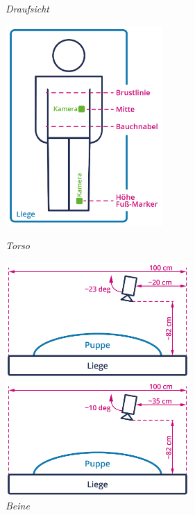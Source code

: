 \documentclass[a4paper, 10pt]{article}
\begin{document}
\begin{figure}[H]
    \centering
    \begin{minipage}[c]{0.475\linewidth}
        \centering
        \captionsetup{labelformat=empty}
        \caption{\textit{Draufsicht} \hspace*{10mm}}
        \vspace*{-4mm}
        \includegraphics[width=60mm]{cam-placements_topview.png}
    \end{minipage}
    \hspace*{-4mm}
    \begin{minipage}[c]{0.5\linewidth}
        \centering
        \captionsetup{labelformat=empty}

        \caption{\textit{Torso}}
        \vspace*{-6mm}
        \includegraphics[width=70mm]{cam-placements_torso.png}

        \vspace*{4mm}

        \caption{\textit{Beine}}
        \vspace*{-6mm}
        \includegraphics[width=70mm]{cam-placements_legs.png}
    \end{minipage}
\end{figure}
\end{document}
